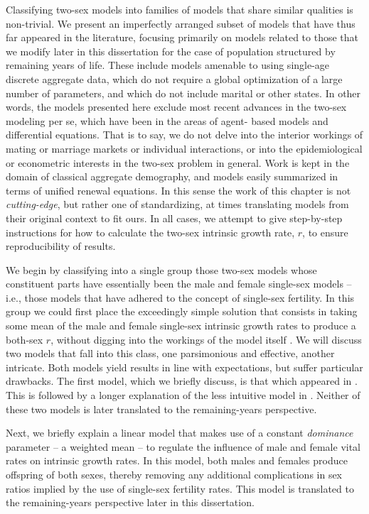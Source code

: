 Classifying two-sex models into families of models that share similar qualities
is non-trivial. We present an imperfectly arranged subset of models that
have thus far appeared in the literature, focusing primarily on models
related to those that we modify later in this dissertation for the case of
population structured by remaining years of life. These include models amenable
to using single-age discrete aggregate data, which do not require a global
optimization of a large number of parameters, and which do not include marital
or other states. In other words, the models presented here exclude most recent
advances in the two-sex modeling per se, which have been in the areas of agent-
based models and differential equations. That is to say, we do not delve into the 
interior workings of mating or marriage markets or individual interactions, or
into the epidemiological or econometric interests in the two-sex problem in general. Work
is kept in the domain of classical aggregate demography, and models easily
summarized in terms of unified renewal equations. In this sense the work of
this chapter is not \textit{cutting-edge}, but rather one of standardizing, at
times translating models from their original context to fit ours. In all cases,
we attempt to give step-by-step instructions for how to calculate the
two-sex intrinsic growth rate, $r$, to ensure reproducibility of results.

We begin by classifying into a single group those two-sex models whose
constituent parts have essentially been the male and female single-sex models --
i.e., those models that have adhered to the concept of single-sex fertility. In
this group we could first place the exceedingly simple solution that consists in taking some 
mean of the male and female single-sex intrinsic growth rates to produce a 
both-sex $r$, without digging into the workings of the model
itself \citep[e.g., ][]{kuczynski1932fertility}. We will discuss two models that
fall into this class, one parsimonious and effective, another intricate. Both
models yield results in line with expectations, but suffer
particular drawbacks. The first model, which we briefly discuss, is that
which appeared in \citet{pollard1948measurement}. This is followed by
a longer explanation of the less intuitive model in \citet{mitra1978derivation}.
Neither of these two models is later translated to the remaining-years
perspective.

Next, we briefly explain a linear model that makes use of a constant
\textit{dominance} parameter -- a weighted mean -- to regulate the
influence of male and female vital rates on intrinsic growth rates. In this
model, both males and females produce offspring of both sexes, thereby
removing any additional complications in sex ratios implied by the use of
single-sex fertility rates. This model is translated to the
remaining-years perspective later in this dissertation.

